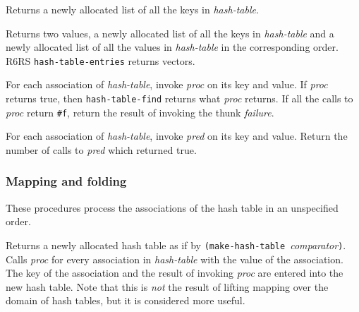 \begin{entry}{%
  }

  Returns a newly allocated list of all the keys in \emph{hash-table}.
\end{entry}

\begin{entry}{%
  }

  Returns two values, a newly allocated list of all the keys in
  \emph{hash-table} and a newly allocated list of all the values in
  \emph{hash-table} in the corresponding order. R6RS
  \texttt{hash-table-entries} returns vectors.
\end{entry}

\begin{entry}{%
  }

  For each association of \emph{hash-table}, invoke \emph{proc} on its
  key and value. If \emph{proc} returns true, then
  \texttt{hash-table-find} returns what \emph{proc} returns. If all
  the calls to \emph{proc} return \texttt{\#f}, return the result of
  invoking the thunk \emph{failure}.
\end{entry}

\begin{entry}{%
  }

For each association of \emph{hash-table}, invoke \emph{pred} on its key
and value. Return the number of calls to \emph{pred} which returned
true.
\end{entry}

\subsubsection{Mapping and folding}\label{Mappingandfolding}

These procedures process the associations of the hash table in an
unspecified order.

\begin{entry}{%
  }

  Returns a newly allocated hash table as if by
  \texttt{(make-hash-table}~\emph{comparator}\texttt{)}. Calls
  \emph{proc} for every association in \emph{hash-table} with the
  value of the association. The key of the association and the result
  of invoking \emph{proc} are entered into the new hash table. Note
  that this is \emph{not} the result of lifting mapping over the
  domain of hash tables, but it is considered more useful.
\end{entry}

